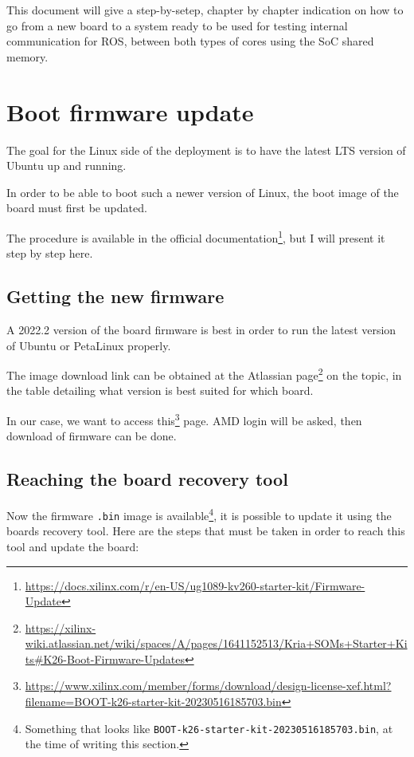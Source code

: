 \documentclass[10pt]{article}
\begin{document}
This document will give a step-by-setep, chapter by chapter indication on how to go from a new board
to a system ready to be used for testing internal communication for ROS, between both types of cores
using the SoC shared memory.

\pagebreak
\section{Boot firmware update}
\label{sec:org78a4134}
The goal for the Linux side of the deployment is to
have the latest LTS version of Ubuntu up and running.

In order to be able to boot such a newer version of Linux, the
boot image of the board must first be updated.

The procedure is available in the official documentation\footnote{\url{https://docs.xilinx.com/r/en-US/ug1089-kv260-starter-kit/Firmware-Update}},
but I will present it step by step here.

\subsection{Getting the new firmware}
\label{sec:org00c235c}
A 2022.2 version of the board firmware is best in order to run the latest
version of Ubuntu or PetaLinux properly.

The image download link can be obtained at the Atlassian page\footnote{\url{https://xilinx-wiki.atlassian.net/wiki/spaces/A/pages/1641152513/Kria+SOMs+Starter+Kits\#K26-Boot-Firmware-Updates}} on the topic,
in the table detailing what version is best suited for which board.

In our case, we want to access this\footnote{\url{https://www.xilinx.com/member/forms/download/design-license-xef.html?filename=BOOT-k26-starter-kit-20230516185703.bin}} page. AMD login will be asked, then
download of firmware can be done.

\subsection{Reaching the board recovery tool}
\label{sec:orgf6b9e3f}
Now the firmware \texttt{.bin} image is available\footnote{Something that looks like \texttt{BOOT-k26-starter-kit-20230516185703.bin}, at the time of writing this section.}, it is possible to update it using the
boards recovery tool. Here are the steps that must be taken in order to reach
this tool and update the board:
\end{document}
